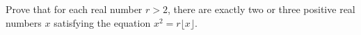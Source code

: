 Prove that for each real number $r>2$, there are exactly two or three positive real numbers $x$ satisfying the equation $x^2=r\lfloor x \rfloor$.